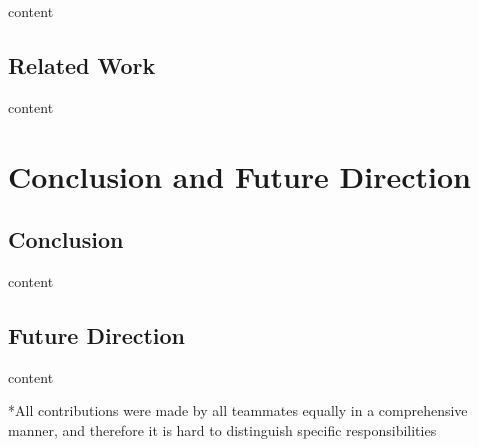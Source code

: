 \documentclass[12pt]{article}
\begin{document}
content


\subsection{Related Work}

content

\section{Conclusion and Future Direction}

\subsection{Conclusion}

content

\subsection{Future Direction}

content


\nocite{*}
\printbibliography

\small{*All contributions were made by all teammates equally in a comprehensive manner, and therefore it is hard to distinguish specific responsibilities}
\end{document}
